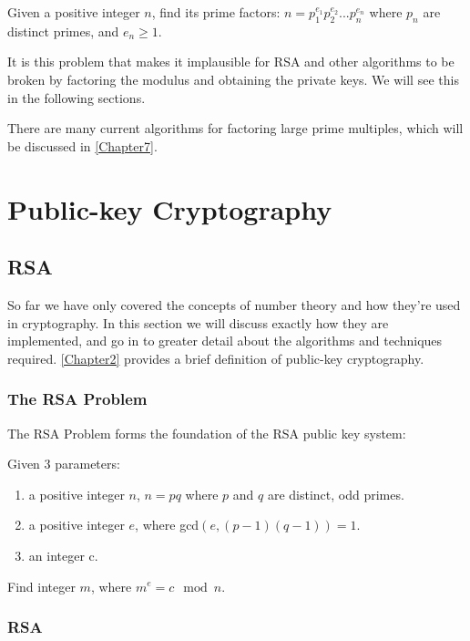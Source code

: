   \begin{mathdef}
    Given a positive integer $n$, find its prime factors: $n = p^{e_1}_1p^{e_2}_2...p^{e_n}_n$ where $p_n$ are distinct primes, and $e_n \geq 1$.
  \end{mathdef}
  
  It is this problem that makes it implausible for RSA and other algorithms to be broken by factoring the modulus and obtaining the private keys. We will see this in the following sections.
  
  There are many current algorithms for factoring large prime multiples, which will be discussed in \textsection \ref{Chapter7}.

\section{Public-key Cryptography}

  \subsection{RSA}
  
  So far we have only covered the concepts of number theory and how they're used in cryptography. In this section we will discuss exactly how they are implemented, and go in to greater detail about the algorithms and techniques required. \textsection \ref{Chapter2} provides a brief definition of public-key cryptography.
  
    \subsubsection{The RSA Problem}
    
    The RSA Problem forms the foundation of the RSA public key system:
    
    \begin{mathdef}
      Given 3 parameters:
      \begin{enumerate}
        \item a positive integer $n$, $n=pq$ where $p$ and $q$ are distinct, odd primes.
        \item a positive integer $e$, where gcd$(e, (p-1)(q-1)) = 1$.
        \item an integer c.
      \end{enumerate} 
      Find integer $m$, where $m^e = c \mod{n}$.
    \end{mathdef}
    
    \subsubsection{RSA}
    
